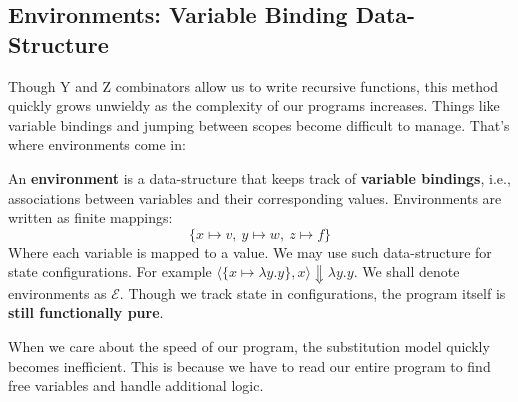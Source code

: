 \subsection{Environments: Variable Binding Data-Structure}
\noindent
Though Y and Z combinators allow us to write recursive functions, this method quickly grows unwieldy as the complexity of our programs increases.
Things like variable bindings and jumping between scopes become difficult to manage. That's where environments come in:
\begin{Def}[Environment]

    \label{def:environment}

    \noindent
    An \textbf{environment} is a data-structure that keeps track of \textbf{variable bindings}, i.e., associations between variables and their corresponding values. Environments are written as finite mappings:
    \LARGE
    \[
        \{ x \mapsto v,\ y \mapsto w,\ z \mapsto f \}
    \]
    \normalsize
    Where each variable is mapped to a value. We may use such data-structure for state configurations. For example $\langle\{x\mapsto \lambda y.y\}, x  \rangle \Downarrow \lambda y.y$. We shall denote environments as $\mathcal{E}$.
    Though we track state in configurations, the program itself is \textbf{still functionally pure}.
\end{Def}
\noindent

\begin{theo}

    When we care about the speed of our program, the substitution model quickly becomes inefficient.
    This is because we have to read our entire program to find free variables and handle additional logic.
\end{theo}

